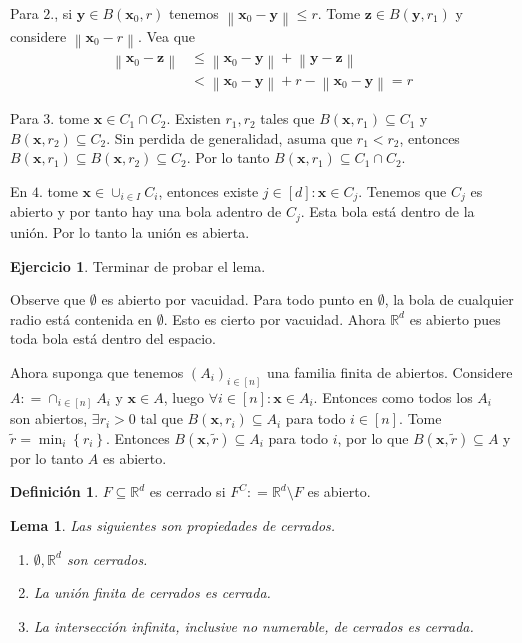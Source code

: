 \documentclass[12pt]{article}
\theoremstyle{plain}
\newtheorem{Lem}[Th]{Lema}             %
\theoremstyle{definition}
\newtheorem{Def}[Th]{Definición}       %
\newtheorem{Ej}[Th]{Ejercicio}
\theoremstyle{remark}
\numberwithin{equation}{section}
\newcommand{\bR}{\mathbb{R}}        %
\renewcommand{\leq}{\leqslant}      %
\renewcommand{\:}{\colon}           %
\renewcommand{\vec}[1]{\mathbf{#1}}
\newcommand{\vx}{\vec{x}}           %
\newcommand{\vy}{\vec{y}}
\newcommand{\vz}{\vec{z}}
\newcommand{\conj}[1]{\left\lbrace#1\right\rbrace}
\newcommand{\bonj}[1]{\left\lbrack#1\right\rbrack}
\newcommand{\nm}[1]{\left\|#1\right\|} %
\begin{document}
\begin{multicols}{2}
\begin{ptcbp}
Para $\mathit{2}.$, si $\vy\in B(\vx_0,r)$ tenemos $\nm{\vx_0-\vy}\leq r$. Tome $\vz\in B(\vy,r_1)$ y considere $\nm{\vx_0-r}$. Vea que
\begin{align*}
  \nm{\vx_0-\vz} &\leq \nm{\vx_0-\vy}+\nm{\vy-\vz} \\
  &<\nm{\vx_0-\vy}+r-\nm{\vx_0-\vy} = r
\end{align*}



Para $\mathit{3}.$ tome $\vx\in C_1\cap C_2$. Existen $r_1,r_2$ tales que $B(\vx,r_1)\subseteq C_1$ y $B(\vx,r_2)\subseteq C_2$. Sin perdida de generalidad, asuma que $r_1<r_2$, entonces $B(\vx,r_1)\subseteq B(\vx,r_2)\subseteq C_2$. Por lo tanto $B(\vx,r_1)\subseteq C_1\cap C_2$.\par
En $\mathit{4}.$ tome $\vx\in\cup_{i\in I} C_i$, entonces existe $j\in\bonj{d}: \vx\in C_j$. Tenemos que $C_j$ es abierto y por tanto hay una bola adentro de $C_j$. Esta bola está dentro de la unión. Por lo tanto la unión es abierta.
\end{ptcbp}

\begin{Ej}
  Terminar de probar el lema.
\end{Ej}

\begin{ptcb}
Observe que $\emptyset$ es abierto por vacuidad. Para todo punto en $\emptyset$, la bola de cualquier radio está contenida en $\emptyset$. Esto es cierto por vacuidad. Ahora $\bR^d$ es abierto pues toda bola está dentro del espacio.\par
Ahora suponga que tenemos $(A_i)_{i\in\bonj{n}}$ una familia finita de abiertos. Considere $A\colon=\cap_{i\in\bonj{n}}A_i$ y $\vec{x}\in A$, luego $\forall i\in\bonj{n}: \vx\in A_i$. Entonces como todos los $A_i$ son abiertos, $\exists r_i>0$ tal que $B(\vx,r_i)\subseteq A_i$ para todo $i\in\bonj{n}$. Tome $\tilde{r}=\min_i\conj{r_i}$. Entonces $B(\vx,\tilde{r})\subseteq A_i$ para todo $i$, por lo que $B(\vx,\tilde{r})\subseteq A$ y por lo tanto $A$ es abierto.

\end{ptcb}

\begin{Def}
  $F\subseteq\bR^d$ es cerrado si $F^C\colon= \bR^d\setminus F$ es abierto.
\end{Def}

\begin{Lem}\label{lem:propiedadesConjsCerrados} Las siguientes son propiedades de cerrados.
  \begin{enumerate}
    \item $\emptyset, \bR^d$ son cerrados.
    \item La unión finita de cerrados es cerrada.
    \item La intersección infinita, inclusive no numerable, de cerrados es cerrada.
  \end{enumerate}
\end{Lem}


\end{multicols}
\end{document}
